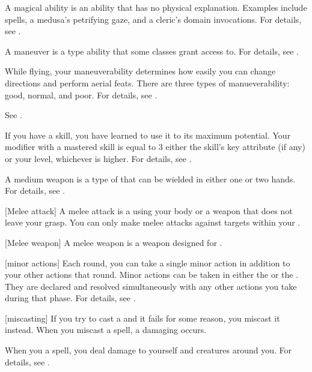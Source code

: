  A magical ability is an ability that has no physical explanation.
Examples include spells, a medusa's petrifying gaze, and a cleric's domain invocations.
For details, see .

 A maneuver is a type  ability that some classes grant access to.
For details, see .

 While flying, your maneuverability determines how easily you can change directions and perform aerial feats.
There are three types of manueverability: good, normal, and poor.
For details, see .

 See .

 If you have  a skill, you have learned to use it to its maximum potential.
Your modifier with a mastered skill is equal to 3 \add either the skill's key attribute (if any) or your level, whichever is higher.
For details, see .

 A medium weapon is a type of  that can be wielded in either one or two hands.
For details, see .

[Melee attack] A melee attack is a  using your body or a weapon that does not leave your grasp.
You can only make melee attacks against targets within your .

[Melee weapon] A melee weapon is a weapon designed for .

[minor actions] Each round, you can take a single minor action in addition to your other actions that round.
Minor actions can be taken in either the  or the .
They are declared and resolved simultaneously with any other actions you take during that phase.
For details, see .

[miscasting] If you try to cast a  and it fails for some reason, you miscast it instead.
When you miscast a spell, a damaging  occurs.

 When you  a spell, you deal damage to yourself and creatures around you.
For details, see .


